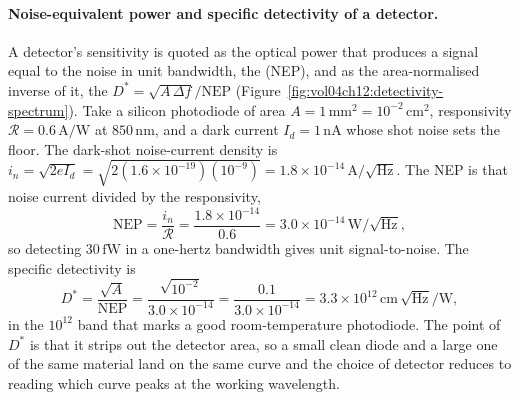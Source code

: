 \paragraph{Noise-equivalent power and specific detectivity of a detector.}
A detector's sensitivity is quoted as the optical power that produces a
signal equal to the noise in unit bandwidth, the  (NEP), and as the area-normalised inverse of it, the  $D^{*} = \sqrt{A\,\Delta f}/\text{NEP}$
(Figure~\ref{fig:vol04ch12:detectivity-spectrum}). Take a silicon photodiode
of area $A = 1\,\si{\milli\meter\squared} = 10^{-2}\,\si{\centi\meter
\squared}$, responsivity $\mathcal{R} = 0.6\,\si{\ampere\per\watt}$ at
$850\,\si{\nano\meter}$, and a dark current $I_d = 1\,\si{\nano\ampere}$
whose shot noise sets the floor. The dark-shot noise-current density is
$i_n = \sqrt{2eI_d} = \sqrt{2(1.6\times 10^{-19})(10^{-9})} = 1.8\times
10^{-14}\,\text{A}/\sqrt{\text{Hz}}$. The NEP is that noise current
divided by the responsivity,
\[
\text{NEP} = \frac{i_n}{\mathcal{R}}
           = \frac{1.8\times 10^{-14}}{0.6}
           = 3.0\times 10^{-14}\,\text{W}/\sqrt{\text{Hz}},
\]
so detecting $30\,\si{\femto\watt}$ in a one-hertz bandwidth gives unit
signal-to-noise. The specific detectivity is
\[
D^{*} = \frac{\sqrt{A}}{\text{NEP}}
      = \frac{\sqrt{10^{-2}}}{3.0\times 10^{-14}}
      = \frac{0.1}{3.0\times 10^{-14}}
      = 3.3\times 10^{12}\,\text{cm}\,\sqrt{\text{Hz}}/\text{W},
\]
in the $10^{12}$ band that marks a good room-temperature photodiode. The
point of $D^{*}$ is that it strips out the detector area, so a small clean
diode and a large one of the same material land on the same curve and the
choice of detector reduces to reading which curve peaks at the working
wavelength.

